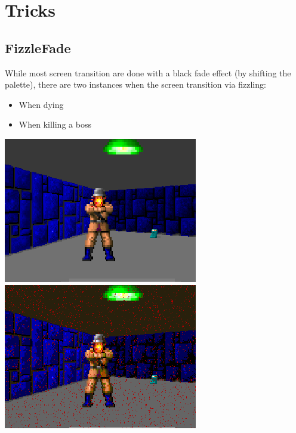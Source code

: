 \section{Tricks}






\subsection{FizzleFade}
While most screen transition are done with a black fade effect (by shifting the palette), there are two instances
when the screen transition via fizzling:
\begin{itemize}
	\item When dying
	\item When killing a boss
\end{itemize}




\begin{minipage}{\textwidth}
\centering
  \includegraphics[width=.9\textwidth]{screenshots/fizzlefade/dying/screenshot_16.png}\\
  \vspace*{0.5cm}
  \includegraphics[width=.9\textwidth]{screenshots/fizzlefade/dying/screenshot_19.png}\\
\end{minipage}

